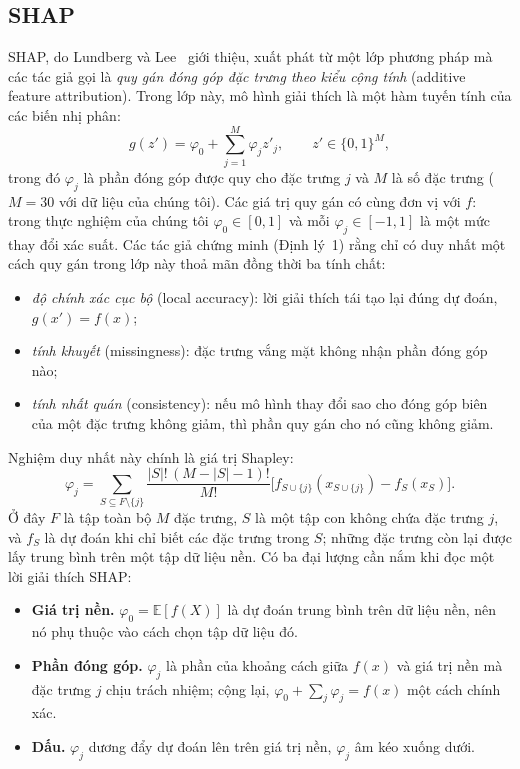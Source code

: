 \documentclass[11pt,a4paper]{article}
\begin{document}
\subsection{SHAP}
\label{sec:shap}
SHAP, do Lundberg và Lee~\cite{lundberg} giới thiệu, xuất phát từ một lớp
phương pháp mà các tác giả gọi là \emph{quy gán đóng góp đặc trưng theo kiểu
cộng tính} (additive feature attribution). Trong lớp này, mô hình giải thích
là một hàm tuyến tính của các biến nhị phân:
\begin{equation}
g(z') = \varphi_0 + \sum_{j=1}^{M} \varphi_j z'_j, \qquad z' \in \{0, 1\}^M,
\end{equation}
trong đó $\varphi_j$ là phần đóng góp được quy cho đặc trưng $j$ và $M$ là số
đặc trưng ($M = 30$ với dữ liệu của chúng tôi). Các giá trị quy gán có cùng
đơn vị với $f$: trong thực nghiệm của chúng tôi $\varphi_0 \in [0, 1]$ và mỗi
$\varphi_j \in [-1, 1]$ là một mức thay đổi xác suất. Các tác giả chứng minh
(Định lý~1) rằng chỉ có duy nhất một cách quy gán trong lớp này thoả mãn đồng
thời ba tính chất:
\begin{itemize}
  \item \emph{độ chính xác cục bộ} (local accuracy): lời giải thích tái tạo
        lại đúng dự đoán, $g(x') = f(x)$;
  \item \emph{tính khuyết} (missingness): đặc trưng vắng mặt không nhận phần
        đóng góp nào;
  \item \emph{tính nhất quán} (consistency): nếu mô hình thay đổi sao cho
        đóng góp biên của một đặc trưng không giảm, thì phần quy gán cho nó
        cũng không giảm.
\end{itemize}
Nghiệm duy nhất này chính là giá trị Shapley:
\begin{equation}
\varphi_j = \sum_{S \subseteq F \setminus \{j\}} \frac{|S|! \, (M - |S| - 1)!}{M!} \Big[ f_{S \cup \{j\}}(x_{S \cup \{j\}}) - f_S(x_S) \Big].
\end{equation}
Ở đây $F$ là tập toàn bộ $M$ đặc trưng, $S$ là một tập con không chứa đặc
trưng $j$, và $f_S$ là dự đoán khi chỉ biết các đặc trưng trong $S$; những
đặc trưng còn lại được lấy trung bình trên một tập dữ liệu nền. Có ba đại
lượng cần nắm khi đọc một lời giải thích SHAP:
\begin{itemize}
  \item \textbf{Giá trị nền.} $\varphi_0 = \mathbb{E}[f(X)]$ là dự đoán trung
        bình trên dữ liệu nền, nên nó phụ thuộc vào cách chọn tập dữ liệu đó.
  \item \textbf{Phần đóng góp.} $\varphi_j$ là phần của khoảng cách giữa
        $f(x)$ và giá trị nền mà đặc trưng $j$ chịu trách nhiệm; cộng lại,
        $\varphi_0 + \sum_j \varphi_j = f(x)$ một cách chính xác.
  \item \textbf{Dấu.} $\varphi_j$ dương đẩy dự đoán lên trên giá trị nền,
        $\varphi_j$ âm kéo xuống dưới.
\end{itemize}
\end{document}
